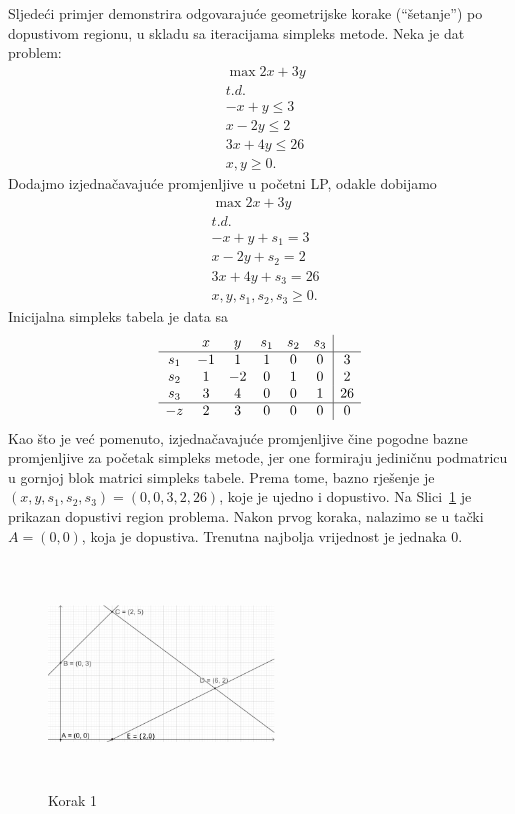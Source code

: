\documentclass[a4paper, utf8, 11pt, colorlinks]{book}
\theoremstyle{definition}
\begin{document}
Sljedeći primjer demonstrira odgovarajuće geometrijske korake (``šetanje'') po dopustivom regionu, u skladu sa iteracijama simpleks metode.   %
 Neka je dat problem:
 \begin{align*}
 	&\max 2x + 3y \\
 	&  {t.d.} \\
 	& -x + y \leq 3 \\
 	& x - 2y \leq 2 \\
 	& 3x + 4y \leq 26 \\
 	& x, y \geq 0.
 \end{align*}
 Dodajmo izjednačavajuće promjenljive u početni LP, odakle dobijamo 
  \begin{align*}
 	&\max 2x + 3y \\
 	& t.d. \\
 	& -x + y + s_1 = 3 \\
 	& x - 2y + s_2 = 2 \\
 	& 3x + 4y + s_3 =  26 \\
 	& x, y, s_1, s_2, s_3 \geq 0.
 \end{align*}
 Inicijalna simpleks 
tabela je data sa
$$\begin{array}{cccccc| c}
	& x & y & s_1 & s_2 & s_3 & \\ \hline
	s_1  & -1 & 1 & 1 & 0 & 0 & 3 \\
	s_2  & 1 & -2 & 0 & 1 & 0 & 2 \\
	s_3  & 3 & 4 & 0 & 0 & 1 & 26 \\ \hline
	-z  & 2 & 3 & 0 & 0 & 0 & 0 \\
\end{array}
$$ 
Kao što je već pomenuto, izjednačavajuće promjenljive čine pogodne bazne promjenljive za početak simpleks metode, jer one formiraju jediničnu podmatricu u gornjoj blok matrici 
simpleks tabele. Prema tome, bazno rješenje je
$(x, y, s_1, s_2, s_3) = (0, 0, 3, 2, 26)$, koje je ujedno i dopustivo.
Na Slici~\ref{fig:step-1} je prikazan dopustivi region problema. Nakon prvog koraka, nalazimo se u tački $A=(0,0)$, koja je dopustiva. Trenutna najbolja vrijednost je jednaka 0. 
\begin{figure}[H]
	\centering
	\includegraphics[width=170pt, height=170pt]{simpleks-primjer-2-sl1.eps}
	\caption{Korak 1}
	\label{fig:step-1}
\end{figure}
\end{document}

